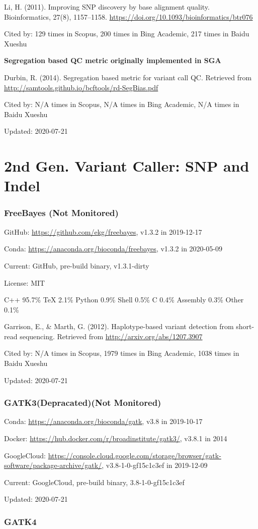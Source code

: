 \documentclass[]{article}
\newcommand{\nm}{{\color{red}(Not Monitored)}}
\newcommand{\de}{{\color{red}(Depracated)}}
\newcommand{\cb}[3]{\par Cited by: {\color{blue}\Huge #1} times in Scopus, {\color{blue}\Huge #2} times in Bing Academic, {\color{blue}\Huge #3} times in Baidu Xueshu}
\begin{document}
Li, H. (2011). Improving SNP discovery by base alignment quality. Bioinformatics, 27(8), 1157–1158. \url{https://doi.org/10.1093/bioinformatics/btr076}\cb{129}{200}{217}

\textbf{Segregation based QC metric originally implemented in SGA}

Durbin, R. (2014). Segregation based metric for variant call QC. Retrieved from \url{http://samtools.github.io/bcftools/rd-SegBias.pdf}\cb{N/A}{N/A}{N/A}

Updated: 2020-07-21

\part{2nd Gen. Variant Caller: SNP and Indel}
\section{FreeBayes \nm}

GitHub: \url{https://github.com/ekg/freebayes}, v1.3.2 in 2019-12-17

Conda: \url{https://anaconda.org/bioconda/freebayes}, v1.3.2 in 2020-05-09

Current: GitHub, pre-build binary, v1.3.1-dirty

License: MIT

C++ 95.7\% TeX 2.1\% Python 0.9\% Shell 0.5\% C 0.4\% Assembly 0.3\% Other 0.1\%

Garrison, E., \& Marth, G. (2012). Haplotype-based variant detection from short-read sequencing. Retrieved from \url{http://arxiv.org/abs/1207.3907}\cb{N/A}{1979}{1038}

Updated: 2020-07-21

\section{GATK3\de\nm}

Conda: \url{https://anaconda.org/bioconda/gatk}, v3.8 in 2019-10-17

Docker: \url{https://hub.docker.com/r/broadinstitute/gatk3/}, v3.8.1 in 2014

GoogleCloud: \url{https://console.cloud.google.com/storage/browser/gatk-software/package-archive/gatk/}, v3.8-1-0-gf15c1c3ef in 2019-12-09

Current: GoogleCloud, pre-build binary, 3.8-1-0-gf15c1c3ef

Updated: 2020-07-21

\section{GATK4}
\end{document}
